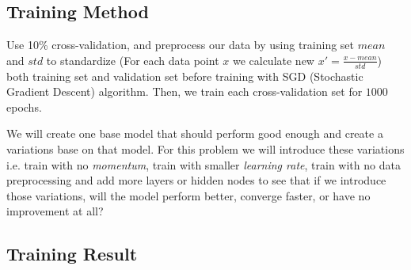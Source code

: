 \documentclass{article}
\begin{document}
\subsection*{Training Method}
Use 10\% cross-validation, and preprocess our data by using training set $mean$ 
and $std$ to standardize (For each data point $x$ we calculate new 
$x' = \frac{x - mean}{std}$) both training set and validation set before 
training with SGD (Stochastic Gradient Descent) algorithm. 
Then, we train each cross-validation set for $1000$ epochs.

We will create one base model that should perform good enough 
and create a variations base on that model. For this problem we will introduce these variations
i.e. train with no \emph{momentum}, train with smaller \emph{learning rate}, train with no data preprocessing 
and add more layers or hidden nodes to see that if we introduce those variations, 
will the model perform better, converge faster, or have no improvement at all?

\newpage
\subsection*{Training Result}
\end{document}
